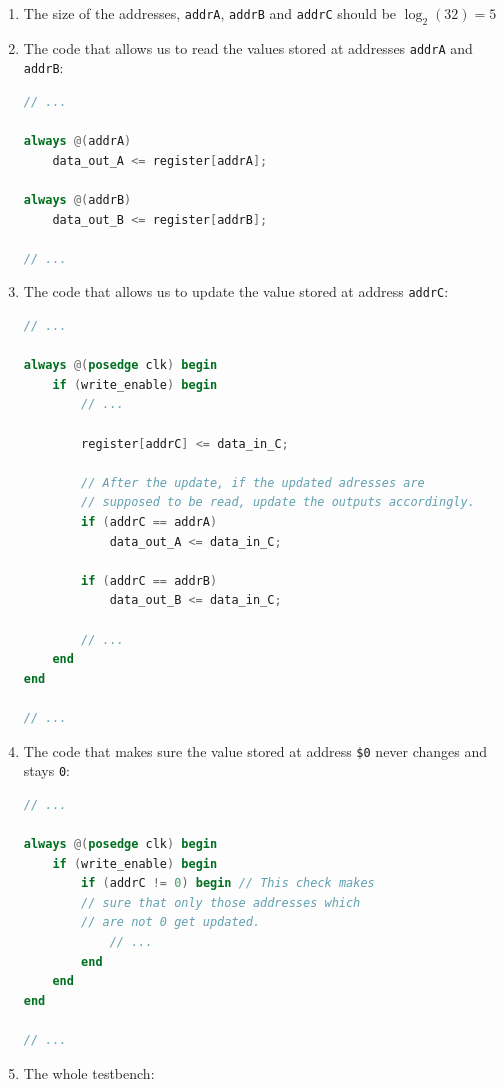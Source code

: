 \documentclass{article}
\begin{document}
    \begin{enumerate}
        \item {
            The size of the addresses, \verb|addrA|, \verb|addrB| and \verb|addrC| should be \(\log_2(32) = 5\)
        }
        \item {
            The code that allows us to read the values stored at addresses \verb|addrA| and \verb|addrB|:

            \begin{lstlisting}[language=verilog]
// ...

always @(addrA)
    data_out_A <= register[addrA];

always @(addrB)
    data_out_B <= register[addrB];

// ...\end{lstlisting}
        }
        \item {
            The code that allows us to update the value stored at address \verb|addrC|:

            \begin{lstlisting}[language=verilog]
// ...

always @(posedge clk) begin
    if (write_enable) begin
        // ...

        register[addrC] <= data_in_C;

        // After the update, if the updated adresses are
        // supposed to be read, update the outputs accordingly.
        if (addrC == addrA)
            data_out_A <= data_in_C;
            
        if (addrC == addrB)
            data_out_B <= data_in_C;
        
        // ...
    end
end

// ...\end{lstlisting}
        }
        \item {
            The code that makes sure the value stored at address \verb|$0| never changes and stays \verb|0|:

            \begin{lstlisting}[language=verilog]
// ...

always @(posedge clk) begin
    if (write_enable) begin
        if (addrC != 0) begin // This check makes 
        // sure that only those addresses which 
        // are not 0 get updated.
            // ...
        end
    end
end

// ...\end{lstlisting}
        }
        \item {
            The whole testbench:

}
\end{enumerate}
\end{document}
